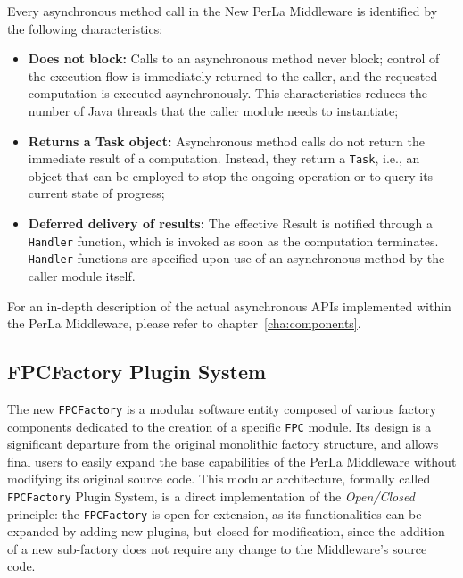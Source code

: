 Every asynchronous method call in the New PerLa Middleware is identified by the
following characteristics:

\begin{itemize}

    \item \textbf{Does not block:} Calls to an asynchronous method never block;
        control of the execution flow is immediately returned to the caller,
        and the requested computation is executed asynchronously. This
        characteristics reduces the number of Java threads that the caller
        module needs to instantiate;

    \item \textbf{Returns a Task object:} Asynchronous method calls do not
        return the immediate result of a computation. Instead, they return a
        \texttt{Task}, i.e., an object that can be employed to stop the ongoing
        operation or to query its current state of progress;

    \item \textbf{Deferred delivery of results:} The effective Result is
        notified through a \texttt{Handler} function, which is invoked as soon
        as the computation terminates. \texttt{Handler} functions are specified
        upon use of an asynchronous method by the caller module itself.

\end{itemize}

For an in-depth description of the actual asynchronous APIs implemented within
the PerLa Middleware, please refer to chapter~\ref{cha:components}.


\subsection{FPCFactory Plugin System}
\label{sec:newmiddleware.factory}

The new \texttt{FPCFactory} is a modular software entity composed of various
factory components dedicated to the creation of a specific \texttt{FPC} module.
Its design is a significant departure from the original monolithic factory
structure, and allows final users to easily expand the base capabilities of the
PerLa Middleware without modifying its original source code. This modular
architecture, formally called \texttt{FPCFactory} Plugin System, is a direct
implementation of the \textit{Open/Closed} principle: the \texttt{FPCFactory}
is open for extension, as its functionalities can be expanded by adding new
plugins, but closed for modification, since the addition of a new sub-factory
does not require any change to the Middleware's source code.

